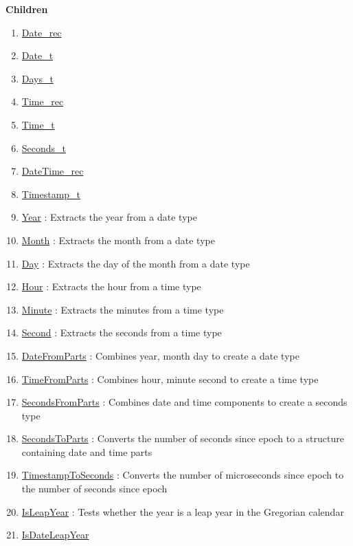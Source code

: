 \textbf{Children}
\begin{enumerate}
\item \hyperlink{ecldoc:date.date_rec}{Date\_rec}
\item \hyperlink{ecldoc:date.date_t}{Date\_t}
\item \hyperlink{ecldoc:date.days_t}{Days\_t}
\item \hyperlink{ecldoc:date.time_rec}{Time\_rec}
\item \hyperlink{ecldoc:date.time_t}{Time\_t}
\item \hyperlink{ecldoc:date.seconds_t}{Seconds\_t}
\item \hyperlink{ecldoc:date.datetime_rec}{DateTime\_rec}
\item \hyperlink{ecldoc:date.timestamp_t}{Timestamp\_t}
\item \hyperlink{ecldoc:date.year}{Year}
: Extracts the year from a date type
\item \hyperlink{ecldoc:date.month}{Month}
: Extracts the month from a date type
\item \hyperlink{ecldoc:date.day}{Day}
: Extracts the day of the month from a date type
\item \hyperlink{ecldoc:date.hour}{Hour}
: Extracts the hour from a time type
\item \hyperlink{ecldoc:date.minute}{Minute}
: Extracts the minutes from a time type
\item \hyperlink{ecldoc:date.second}{Second}
: Extracts the seconds from a time type
\item \hyperlink{ecldoc:date.datefromparts}{DateFromParts}
: Combines year, month day to create a date type
\item \hyperlink{ecldoc:date.timefromparts}{TimeFromParts}
: Combines hour, minute second to create a time type
\item \hyperlink{ecldoc:date.secondsfromparts}{SecondsFromParts}
: Combines date and time components to create a seconds type
\item \hyperlink{ecldoc:date.secondstoparts}{SecondsToParts}
: Converts the number of seconds since epoch to a structure containing date and time parts
\item \hyperlink{ecldoc:date.timestamptoseconds}{TimestampToSeconds}
: Converts the number of microseconds since epoch to the number of seconds since epoch
\item \hyperlink{ecldoc:date.isleapyear}{IsLeapYear}
: Tests whether the year is a leap year in the Gregorian calendar
\item \hyperlink{ecldoc:date.isdateleapyear}{IsDateLeapYear}

\end{enumerate}
